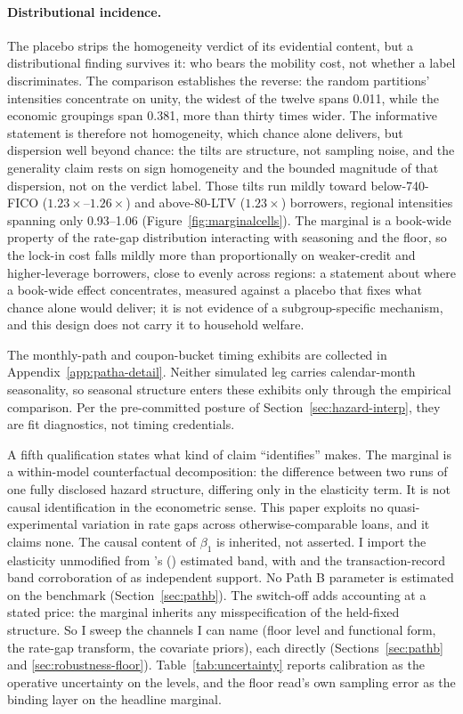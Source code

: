 \documentclass[12pt]{article}
\newcommand{\citepos}[1]{\citeauthor{#1}'s (\citeyear{#1})}
\begin{document}
\paragraph{Distributional incidence.} The placebo strips the homogeneity verdict of its evidential content, but a distributional finding survives it: who bears the mobility cost, not whether a label discriminates. The comparison establishes the reverse: the random partitions' intensities concentrate on unity, the widest of the twelve spans 0.011, while the economic groupings span 0.381, more than thirty times wider. The informative statement is therefore not homogeneity, which chance alone delivers, but dispersion well beyond chance: the tilts are structure, not sampling noise, and the generality claim rests on sign homogeneity and the bounded magnitude of that dispersion, not on the verdict label. Those tilts run mildly toward below-740-FICO ($1.23\times$--$1.26\times$) and above-80-LTV ($1.23\times$) borrowers, regional intensities spanning only 0.93--1.06 (Figure~\ref{fig:marginalcells}). The marginal is a book-wide property of the rate-gap distribution interacting with seasoning and the floor, so the lock-in cost falls mildly more than proportionally on weaker-credit and higher-leverage borrowers, close to evenly across regions: a statement about where a book-wide effect concentrates, measured against a placebo that fixes what chance alone would deliver; it is not evidence of a subgroup-specific mechanism, and this design does not carry it to household welfare.

The monthly-path and coupon-bucket timing exhibits are collected in Appendix~\ref{app:patha-detail}. Neither simulated leg carries calendar-month seasonality, so seasonal structure enters these exhibits only through the empirical comparison. Per the pre-committed posture of Section~\ref{sec:hazard-interp}, they are fit diagnostics, not timing credentials.

A fifth qualification states what kind of claim ``identifies'' makes. The marginal is a within-model counterfactual decomposition: the difference between two runs of one fully disclosed hazard structure, differing only in the elasticity term. It is not causal identification in the econometric sense. This paper exploits no quasi-experimental variation in rate gaps across otherwise-comparable loans, and it claims none. The causal content of $\beta_1$ is inherited, not asserted. I import the elasticity unmodified from \citepos{liebersohn2024} estimated band, with \citet{fonseca2024} and the transaction-record band corroboration of \citet{graybill2026} as independent support. No Path B parameter is estimated on the benchmark (Section~\ref{sec:pathb}). The switch-off adds accounting at a stated price: the marginal inherits any misspecification of the held-fixed structure. So I sweep the channels I can name (floor level and functional form, the rate-gap transform, the covariate priors), each directly (Sections~\ref{sec:pathb} and \ref{sec:robustness-floor}). Table~\ref{tab:uncertainty} reports calibration as the operative uncertainty on the levels, and the floor read's own sampling error as the binding layer on the headline marginal.
\end{document}
